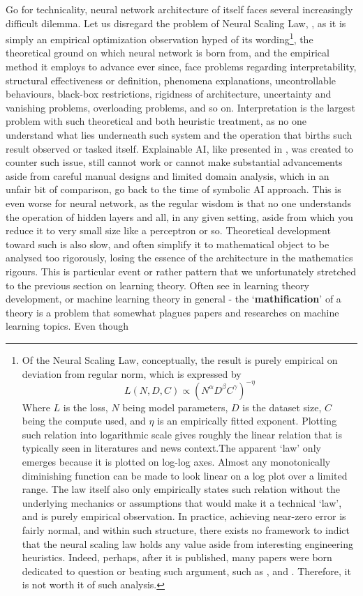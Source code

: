 Go for technicality, neural network architecture of itself faces several increasingly difficult dilemma. Let us disregard the problem of Neural Scaling Law, \cite{kaplan2020scalinglawsneurallanguage}, as it is simply an empirical optimization observation hyped of its wording\footnote{Of the Neural Scaling Law, conceptually, the result is purely empirical on deviation from regular norm, which is expressed by $$L(N,D,C)\propto (N^{\alpha}D^{\beta}C^{\gamma})^{-\eta}$$ Where $L$ is the loss, $N$ being model parameters, $D$ is the dataset size, $C$ being the compute used, and $\eta$ is an empirically fitted exponent. Plotting such relation into logarithmic scale gives roughly the linear relation that is typically seen in literatures and news context.The apparent `law' only emerges because it is plotted on log-log axes. Almost any monotonically diminishing function can be made to look linear on a log plot over a limited range. The law itself also only empirically states such relation without the underlying mechanics or assumptions that would make it a technical `law', and is purely empirical observation. In practice, achieving near-zero error is fairly normal, and within such structure, there exists no framework to indict that the neural scaling law holds any value aside from interesting engineering heuristics. Indeed, perhaps, after it is published, many papers were born dedicated to question or beating such argument, such as \cite{sorscher2023neuralscalinglawsbeating,ivgi-etal-2022-scaling,su2024unravelingmysteryscalinglaws,lee2025neuralscalinglawsleading}, and \cite{doi:10.1073/pnas.2311878121}. Therefore, it is not worth it of such analysis.}, the theoretical ground on which neural network is born from, and the empirical method it employs to advance ever since, face problems regarding interpretability, structural effectiveness or definition, phenomena explanations, uncontrollable behaviours, black-box restrictions, rigidness of architecture, uncertainty and vanishing problems, overloading problems, and so on. Interpretation is the largest problem with such theoretical and both heuristic treatment, as no one understand what lies underneath such system and the operation that births such result observed or tasked itself. Explainable AI, like presented in \cite{hsieh2024comprehensiveguideexplainableai}, was created to counter such issue, still cannot work or cannot make substantial advancements aside from careful manual designs and limited domain analysis, which in an unfair bit of comparison, go back to the time of symbolic AI approach. This is even worse for neural network, as the regular wisdom is that no one understands the operation of hidden layers and all, in any given setting, aside from which you reduce it to very small size like a perceptron or so. Theoretical development toward such is also slow, and often simplify it to mathematical object to be analysed too rigorously, losing the essence of the architecture in the mathematics rigours. This is particular event or rather pattern that we unfortunately stretched to the previous section on learning theory. Often see in learning theory development, or machine learning theory in general - the `\textbf{mathification}' of a theory is a problem that somewhat plagues papers and researches on machine learning topics. Even though 